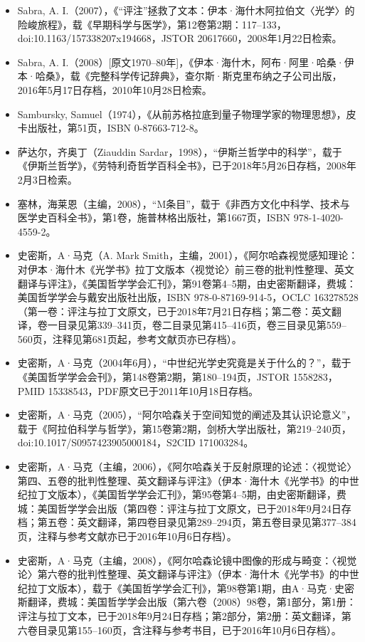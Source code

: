\begin{itemize}
\item Sabra, A. I.（2007），《“评注”拯救了文本：伊本·海什木阿拉伯文〈光学〉的险峻旅程》，载《早期科学与医学》，第12卷第2期：117–133，doi:10.1163/157338207x194668，JSTOR 20617660，2008年1月22日检索。
\item Sabra, A. I.（2008）[原文1970–80年]，《伊本·海什木，阿布·阿里·哈桑·伊本·哈桑》，载《完整科学传记辞典》，查尔斯·斯克里布纳之子公司出版，2016年5月17日存档，2010年10月28日检索。
\item Sambursky, Samuel（1974），《从前苏格拉底到量子物理学家的物理思想》，皮卡出版社，第51页，ISBN 0-87663-712-8。
\item 萨达尔，齐奥丁（Ziauddin Sardar，1998），“伊斯兰哲学中的科学”，载于《伊斯兰哲学》，《劳特利奇哲学百科全书》，已于2018年5月26日存档，2008年2月3日检索。
\item 塞林，海莱恩（主编，2008），“M条目”，载于《非西方文化中科学、技术与医学史百科全书》，第1卷，施普林格出版社，第1667页，ISBN 978-1-4020-4559-2。
\item 史密斯，A·马克（A. Mark Smith，主编，2001），《阿尔哈森视觉感知理论：对伊本·海什木《光学书》拉丁文版本〈视觉论〉前三卷的批判性整理、英文翻译与评注》，《美国哲学学会汇刊》，第91卷第4–5期，由史密斯翻译，费城：美国哲学学会与戴安出版社出版，ISBN 978-0-87169-914-5，OCLC 163278528（第一卷：评注与拉丁文原文，已于2018年7月21日存档；第二卷：英文翻译，卷一目录见第339–341页，卷二目录见第415–416页，卷三目录见第559–560页，注释见第681页起，参考文献页亦已存档）。
\item 史密斯，A·马克（2004年6月），“中世纪光学史究竟是关于什么的？”，载于《美国哲学学会会刊》，第148卷第2期，第180–194页，JSTOR 1558283，PMID 15338543，PDF原文已于2011年10月18日存档。
\item 史密斯，A·马克（2005），“阿尔哈森关于空间知觉的阐述及其认识论意义”，载于《阿拉伯科学与哲学》，第15卷第2期，剑桥大学出版社，第219–240页，doi:10.1017/S0957423905000184，S2CID 171003284。
\item 史密斯，A·马克（主编，2006），《阿尔哈森关于反射原理的论述：〈视觉论〉第四、五卷的批判性整理、英文翻译与评注》（伊本·海什木《光学书》的中世纪拉丁文版本），《美国哲学学会汇刊》，第95卷第4–5期，由史密斯翻译，费城：美国哲学学会出版（第四卷：评注与拉丁文原文，已于2018年9月24日存档；第五卷：英文翻译，第四卷目录见第289–294页，第五卷目录见第377–384页，注释与参考文献亦已于2016年10月6日存档）。
\item 史密斯，A·马克（主编，2008），《阿尔哈森论镜中图像的形成与畸变：〈视觉论〉第六卷的批判性整理、英文翻译与评注》（伊本·海什木《光学书》的中世纪拉丁文版本），载于《美国哲学学会汇刊》，第98卷第1期，由A·马克·史密斯翻译，费城：美国哲学学会出版（第六卷（2008）98卷，第1部分，第1册：评注与拉丁文本，已于2018年9月24日存档；第2部分，第2册：英文翻译，第六卷目录见第155–160页，含注释与参考书目，已于2016年10月6日存档）。

\end{itemize}
